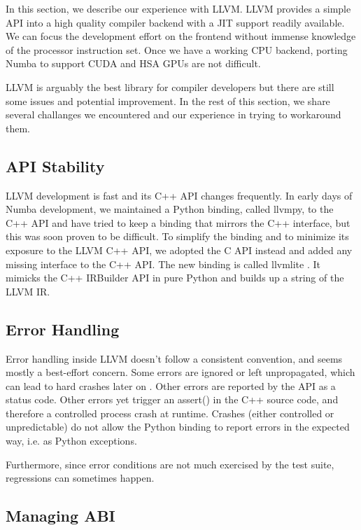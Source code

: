 \documentclass{acm_proc_article-sp}
\begin{document}
In this section, we describe our experience with LLVM.
LLVM provides a simple API into a high quality compiler backend with
a JIT support readily available. We can focus the development effort
on the frontend without immense knowledge of the processor instruction set.
Once we have a working CPU backend, porting Numba to support CUDA and HSA GPUs
are not difficult.

LLVM is arguably the best library for compiler developers but there are still
some issues and potential improvement. In the rest of
this section, we share several challanges we encountered and our experience
in trying to workaround them.

\subsection{API Stability}

LLVM development is fast and its C++ API changes frequently.
In early days of Numba development, we maintained a Python binding,
called llvmpy, to the C++ API and have tried to keep a binding that
mirrors the C++ interface, but this was soon proven to be difficult.
To simplify the binding and to minimize its exposure to the LLVM C++ API,
we adopted the C API instead and added any missing interface to the C++ API.
The new binding is called llvmlite \cite{rtd:llvmlite}.  It mimicks the
C++ IRBuilder API in pure Python and builds up a string of the LLVM IR.

\subsection{Error Handling}

Error handling inside LLVM doesn't follow a consistent convention,
and seems mostly a best-effort concern.  Some errors are ignored or
left unpropagated, which can lead to hard crashes later on
\cite{llvmbugs:selinux}. Other errors are reported by the API as a status
code.  Other errors yet trigger an assert() in the C++ source code, and
therefore a controlled process crash at runtime.  Crashes (either
controlled or unpredictable) do not allow the Python binding to report
errors in the expected way, i.e. as Python exceptions.

Furthermore, since error conditions are not much exercised by the test
suite, regressions can sometimes happen. \cite{llvmbugs:llvmparsebitcode}

\subsection{Managing ABI}
\end{document}
